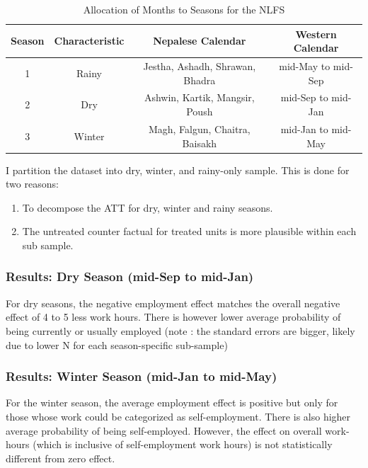 \documentclass[12pt,a4paper]{article}
\begin{document}
\begin{table}[ht]
	
	\caption{Allocation of Months to Seasons for the NLFS}
	\renewcommand{\arraystretch}{1.2}
	\vspace{1em}
	\centering{}%
	\begin{tabular}{|c|c|c|c|}
		\hline
		\textbf{Season} & \textbf{Characteristic}& \textbf{Nepalese Calendar} & \textbf{Western Calendar}\\
		\hline
		1& Rainy & Jestha, Ashadh, Shrawan, Bhadra & mid-May to mid-Sep\\
		\hline
		2& Dry & Ashwin, Kartik, Mangsir, Poush & mid-Sep to mid-Jan \\
		\hline
		3& Winter & Magh, Falgun, Chaitra, Baisakh &  mid-Jan to mid-May\\
		\hline
	\end{tabular}
\end{table}

I partition the dataset into dry, winter, and rainy-only sample. This is done for two reasons:

\begin{enumerate}
	\item To decompose the ATT for dry, winter and rainy seasons.
	\item The untreated counter factual for treated units is more plausible within each sub sample.
\end{enumerate}


\subsubsection{Results: Dry Season (mid-Sep to mid-Jan)}

For dry seasons, the negative employment effect matches the overall negative effect of 4 to 5 less work hours. There is however lower average probability of being currently or usually employed (note : the standard errors are bigger, likely due to lower N for each season-specific sub-sample)


\subsubsection{Results: Winter Season (mid-Jan to mid-May)}


For the winter season, the average employment effect is positive but only for those whose work could be categorized as self-employment. There is also higher average probability of being self-employed. However, the effect on overall work-hours (which is inclusive of self-employment work hours) is not statistically different from zero effect. 
\end{document}
